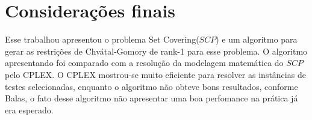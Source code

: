 \section{Considerações finais}\label{sec:consideracoes} 
Esse trabalhou apresentou o problema Set Covering($SCP$) e um algoritmo
para gerar as restrições de Chvátal-Gomory de rank-1 para esse problema.
O algoritmo apresentando foi comparado com a resolução da modelagem matemática do $SCP$ pelo CPLEX.
O CPLEX mostrou-se muito eficiente para resolver as instâncias de testes selecionadas, enquanto o algoritmo
não obteve bons resultados, conforme Balas\cite{balas89}, o fato desse algoritmo não apresentar uma boa 
perfomance na prática já era esperado. 
